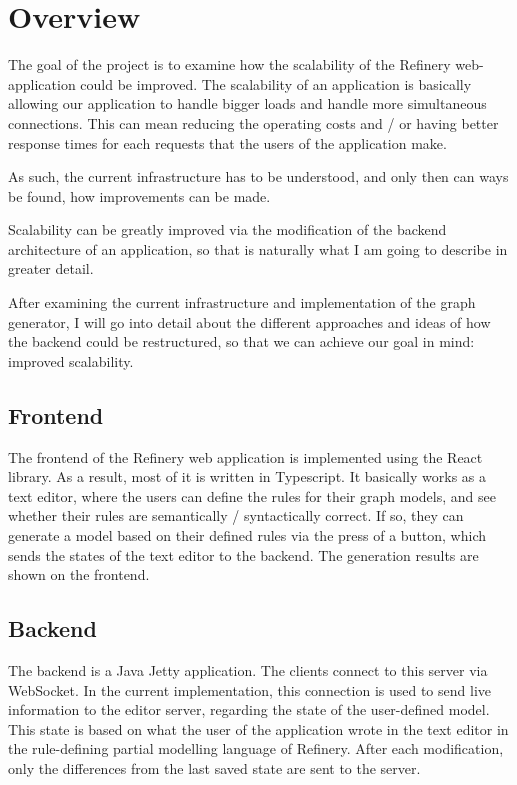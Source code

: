 \chapter{Overview} 
	\label{overview}
	The goal of the project is to examine how the scalability of the Refinery web-application could be improved. 
	The scalability of an application is basically allowing our application to handle bigger loads and handle more simultaneous connections.
	This can mean reducing the operating costs and / or having better response times for each requests that the users of the application make. 

	As such, the current
	infrastructure has to be understood, and only then can ways be found, how improvements can be made.

	Scalability can be greatly improved via the modification of the backend architecture of an application, so that is naturally what
	I am going to describe in greater detail. 

	After examining the current infrastructure and implementation of the graph generator, 
	I will go into detail about the different approaches and ideas of how the backend could be restructured,
	so that we can achieve our goal in mind: improved scalability. 

\section{Frontend} \label{overviewfrontend}
	The frontend of the Refinery web application is implemented using the React library. As a result, most of it is written in Typescript.
	It basically works as a text editor, where the users can define the rules for their graph models, and see whether
	their rules are semantically / syntactically correct. If so, they can generate a model based on their defined rules
	via the press of a button, which sends the states of the text editor to the backend. The generation results 
	are shown on the frontend.

\section{Backend} \label{overviewbackend}
	The backend is a Java Jetty application. The clients connect to this server via WebSocket. 
	In the current implementation,
	this connection is used to send live information to the editor server, 
	regarding the state of the user-defined model.
	This state is based on what the user of the application wrote in the text editor in the
	rule-defining partial modelling language of Refinery. After each modification, only the differences
	from the last saved state are sent to the server.

